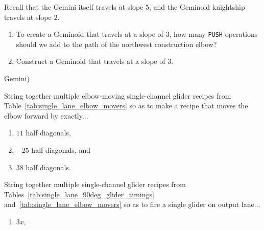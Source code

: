 \begin{multicols}{2}
	
	\mfilbreak
	
	
	\begin{problem}\label{exer:gemini_slope_3}
		Recall that the Gemini itself travels at slope $5$, and the Geminoid knightship travels at slope $2$.
		
		\begin{enumerate}[label=\bf\color{ocre}(\alph*)]
			\item To create a Geminoid that travels at a slope of $3$, how many \texttt{PUSH} operations should we add to the path of the northwest construction elbow?
			
			\item Construct a Geminoid that travels at a slope of $3$.
		\end{enumerate} Gemini)
	\end{problem}
	
	
	\mfilbreak
	
	
	\begin{problem}\label{exer:move_single_channel_elbow}
		String together multiple elbow-moving single-channel glider recipes from Table~\ref{tab:single_lane_elbow_movers} so as to make a recipe that moves the elbow forward by exactly...
		
		\begin{enumerate}[label=\bf\color{ocre}(\alph*)]
			\item $11$ half diagonals,
			
			\item $-25$ half diagonals, and
			
			\item $38$ half diagonals.
		\end{enumerate}
	\end{problem}
	
	
	\mfilbreak
	
	
	\begin{problem}\label{exer:single_channel_90_degree_fire}
		String together multiple single-channel glider recipes from Tables~\ref{tab:single_lane_90deg_glider_timings} and~\ref{tab:single_lane_elbow_movers} so as to fire a single glider on output lane...
		
		\begin{enumerate}[label=\bf\color{ocre}(\alph*)]
			\item $3x$,
			

\end{enumerate}
\end{problem}
\end{multicols}
